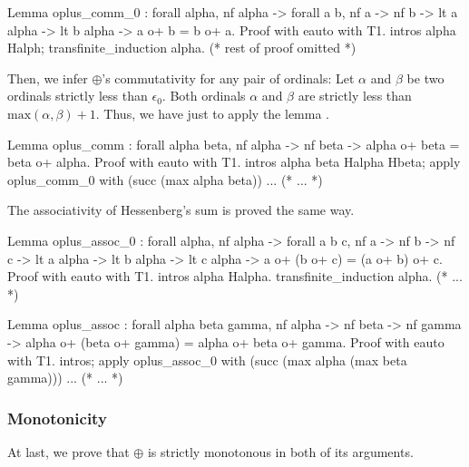 \documentclass[a4paper]{book}
\begin{document}
\begin{Coqsrc}
Lemma oplus_comm_0 : forall alpha, nf alpha ->
     forall a b,  nf a -> nf b ->
                  lt a alpha ->
                  lt b alpha ->
                  a o+ b = b o+ a.
 Proof with eauto with T1.
    intros alpha Halph; transfinite_induction alpha.
(* rest of proof omitted *)  
\end{Coqsrc}

Then, we infer  $\oplus$'s commutativity for any pair of ordinals:
Let $\alpha$ and $\beta$ be two ordinals strictly less than $\epsilon_0$. Both ordinals $\alpha$ and $\beta$ are
strictly less than $\textrm{max}(\alpha,\beta)+1$.
    Thus, we have just to apply the lemma .

\begin{Coqsrc}
  Lemma oplus_comm : forall alpha beta, 
      nf alpha -> nf beta ->
      alpha o+ beta =  beta o+ alpha.
  Proof with eauto with T1.
    intros alpha beta Halpha Hbeta;
    apply oplus_comm_0 with (succ (max alpha beta)) ...  
  (* ... *)
\end{Coqsrc}

The associativity of Hessenberg's sum is proved the same way.


\begin{Coqsrc}
 Lemma oplus_assoc_0 :
    forall alpha,
      nf alpha ->
      forall a b c,  nf a -> nf b -> nf c ->
                      lt a alpha ->
                      lt b alpha -> lt c alpha ->
                      a o+ (b o+ c) = (a o+ b) o+ c.
  Proof with eauto with T1.
    intros alpha Halpha.
    transfinite_induction alpha.
    (* ... *)
\end{Coqsrc}


\begin{Coqsrc}
 Lemma oplus_assoc : forall alpha beta gamma,
                        nf alpha -> nf beta -> nf gamma ->
                                    alpha o+ (beta o+ gamma) =
                                    alpha o+ beta o+ gamma.
 Proof with eauto with T1.
    intros;
    apply oplus_assoc_0 with (succ (max alpha (max beta gamma))) ...
    (* ... *)   
\end{Coqsrc}


\subsubsection{Monotonicity}

At last, we prove that $\oplus$ is strictly monotonous in both of its arguments.
\end{document}
